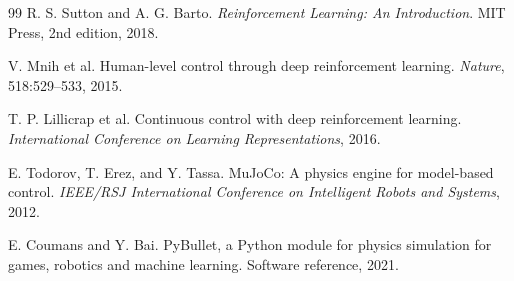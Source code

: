 \documentclass[11pt]{article}
\begin{document}
\begin{thebibliography}{99}
R. S. Sutton and A. G. Barto.
\newblock \emph{Reinforcement Learning: An Introduction}.
\newblock MIT Press, 2nd edition, 2018.

V. Mnih et al.
\newblock Human-level control through deep reinforcement learning.
\newblock \emph{Nature}, 518:529--533, 2015.

T. P. Lillicrap et al.
\newblock Continuous control with deep reinforcement learning.
\newblock \emph{International Conference on Learning Representations}, 2016.

E. Todorov, T. Erez, and Y. Tassa.
\newblock MuJoCo: A physics engine for model-based control.
\newblock \emph{IEEE/RSJ International Conference on Intelligent Robots and Systems}, 2012.

E. Coumans and Y. Bai.
\newblock PyBullet, a Python module for physics simulation for games, robotics and machine learning.
\newblock Software reference, 2021.

\end{thebibliography}
\end{document}

